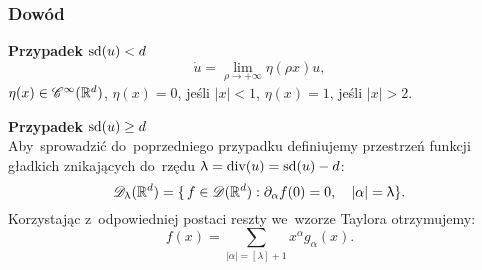 \documentclass[10pt,t]{beamer}
\begin{document}
\begin{frame}
  \frametitle{Dowód}


  \textbf{Przypadek} $\textrm{sd}( u ) < d$ \\
  \begin{equation}
    \label{eq:Epstein-Glaser-06}
    \dot{ u } = \lim\limits_{ \rho \to +\infty } \eta( \rho x ) u,
  \end{equation}
  $\eta( x ) \in \mathcal{C}^{ \infty }( \mathbb{R}^{ d } )$, $\eta( x ) = 0$, jeśli $| x | < 1$,
  $\eta( x ) = 1$, jeśli $| x | > 2$.

  \vspace{\spaceFour}



  \textbf{Przypadek} $\textrm{sd}( u ) \geq d$ \\
  Aby~sprowadzić do~poprzedniego przypadku definiujemy przestrzeń
  funkcji gładkich znikających do~rzędu
  $\uplambda = \textrm{div}( u ) = \textrm{sd}( u ) - d$:
  \begin{equation}
    \label{eq:Epstein-Glaser-07}
    \mathcal{D}_{ \uplambda }( \mathbb{R}^{ d } ) =
    \{ \, f \in \mathcal{D}( \mathbb{R}^{ d } ) : \partial_{ \alpha } f( 0 ) = 0, \quad
    | \alpha | = \uplambda \}.
  \end{equation}
  Korzystając z~odpowiedniej postaci reszty we~wzorze Taylora
  otrzymujemy:
  \begin{equation}
    \label{eq:Epstein-Glaser-08}
    f( x ) = \sum_{ | \alpha | = [ \lambda ] + 1 } x^{ \alpha }
    g_{ \alpha }( x ).
  \end{equation}

\end{frame}
\end{document}
